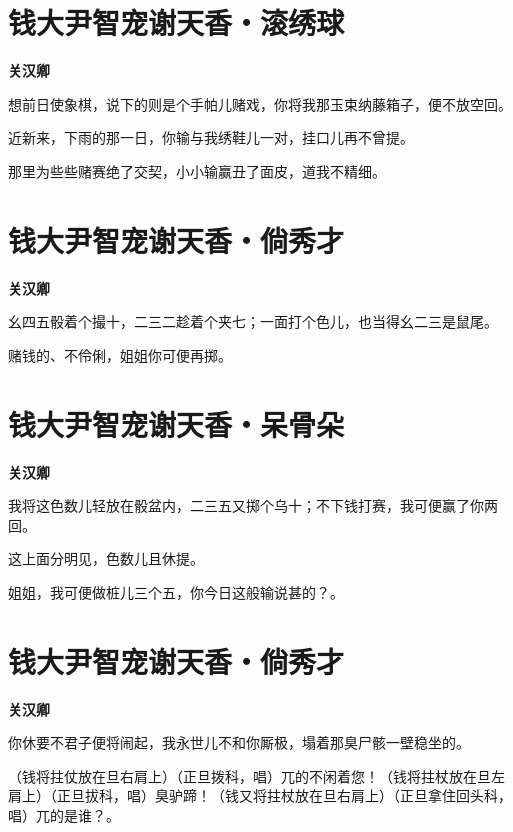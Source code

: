 \documentclass[12pt,a4paper]{ctexbook}
\begin{document}
\section{钱大尹智宠谢天香・滚绣球}
\textbf{关汉卿}\par\vspace{0.5em}
想前日使象棋，说下的则是个手帕儿赌戏，你将我那玉束纳藤箱子，便不放空回。\par
近新来，下雨的那一日，你输与我绣鞋儿一对，挂口儿再不曾提。\par
那里为些些赌赛绝了交契，小小输赢丑了面皮，道我不精细。\par

\section{钱大尹智宠谢天香・倘秀才}
\textbf{关汉卿}\par\vspace{0.5em}
幺四五骰着个撮十，二三二趁着个夹七；一面打个色儿，也当得幺二三是鼠尾。\par
赌钱的、不伶俐，姐姐你可便再掷。\par

\section{钱大尹智宠谢天香・呆骨朵}
\textbf{关汉卿}\par\vspace{0.5em}
我将这色数儿轻放在骰盆内，二三五又掷个乌十；不下钱打赛，我可便赢了你两回。\par
这上面分明见，色数儿且休提。\par
姐姐，我可便做桩儿三个五，你今日这般输说甚的？。\par

\section{钱大尹智宠谢天香・倘秀才}
\textbf{关汉卿}\par\vspace{0.5em}
你休要不君子便将闹起，我永世儿不和你厮极，塌着那臭尸骸一壁稳坐的。\par
（钱将拄仗放在旦右肩上）（正旦拨科，唱）兀的不闲着您！（钱将拄杖放在旦左肩上）（正旦拔科，唱）臭驴蹄！（钱又将拄杖放在旦右肩上）（正旦拿住回头科，唱）兀的是谁？。\par
\end{document}
